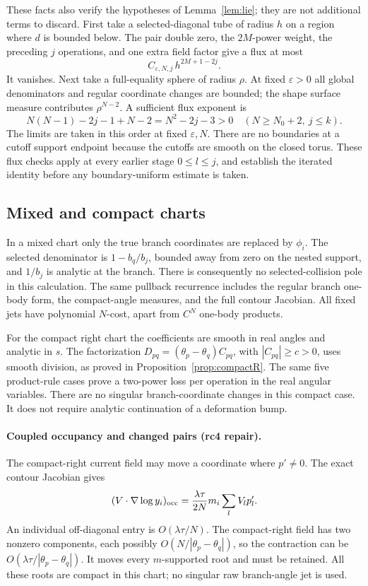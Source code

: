 \documentclass[11pt]{article}
\numberwithin{equation}{section}
\theoremstyle{definition}
\newcommand{\eps}{\varepsilon}
\begin{document}
These facts also verify the hypotheses of Lemma~\ref{lem:lie};
they are not additional terms to discard.
First take a selected-diagonal tube of radius \(h\) on a region
where \(d\) is bounded below. The pair double zero, the
\(2M\)-power weight, the preceding \(j\) operations, and one
extra field factor give a flux at most
\[
 C_{\eps,N,j}\,h^{2M+1-2j}.
\]
It vanishes. Next take a full-equality sphere of radius \(\rho\).
At fixed \(\eps>0\) all global denominators and regular coordinate
changes are bounded; the shape surface measure contributes
\(\rho^{N-2}\). A sufficient flux exponent is
\[
 N(N-1)-2j-1+N-2=N^2-2j-3>0
 \quad(N\ge N_0+2,\ j\le k).
\]
The limits are taken in this order at fixed \(\eps,N\).
There are no boundaries at a cutoff support endpoint because
the cutoffs are smooth on the closed torus. These flux checks
apply at every earlier stage \(0\le l\le j\), and establish the
iterated identity before any boundary-uniform estimate is taken.

\subsection{Mixed and compact charts}
In a mixed chart only the true branch coordinates are replaced
by \(\phi_i\). The selected denominator is \(1-b_q/b_j\), bounded
away from zero on the nested support, and \(1/b_j\) is analytic
at the branch. There is consequently no selected-collision pole
in this calculation. The same pullback recurrence includes the
regular branch one-body form, the compact-angle measures, and
the full contour Jacobian. All fixed jets have polynomial
\(N\)-cost, apart from \(C^N\) one-body products.

For the compact right chart the coefficients are smooth in real
angles and analytic in \(s\). The factorization
\(D_{pq}=(\theta_p-\theta_q)C_{pq}\), with \(|C_{pq}|\ge c>0\),
uses smooth division, as proved in Proposition~\ref{prop:compactR}.
The same five product-rule cases prove a two-power loss per
operation in the real angular variables. There are no singular
branch-coordinate changes in this compact case. It does not
require analytic continuation of a deformation bump.

\paragraph{Coupled occupancy and changed pairs (rc4 repair).}
The compact-right current field may move a coordinate where
\(p'\ne0\). The exact contour Jacobian gives
\[
 (V\cdot\nabla\log y_i)_{\rm occ}
   =\frac{\lambda\tau}{2N}m_i\sum_l V_l p'_l.
\]
An individual off-diagonal entry is \(O(\lambda\tau/N)\).
The compact-right field has two nonzero components, each possibly
\(O(N/|\theta_p-\theta_q|)\), so the contraction can be
\(O(\lambda\tau/|\theta_p-\theta_q|)\). It moves every
\(m\)-supported root and must be retained. All these roots are
compact in this chart; no singular raw branch-angle jet is used.
\end{document}
